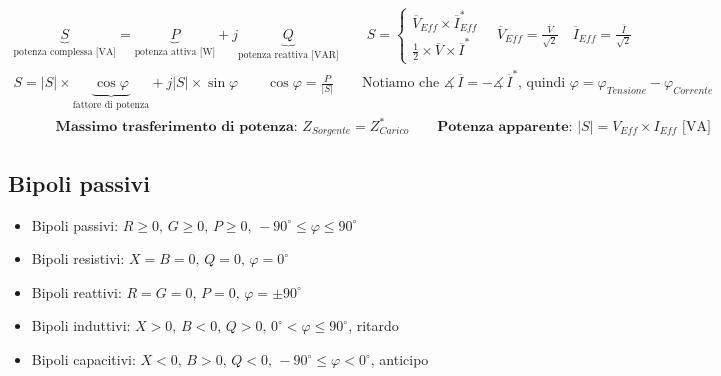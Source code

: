 \documentclass[10pt]{article}
\renewcommand{\deg}{^{\circ}}
\begin{document}
        \begin{gather*}
            \underbrace{S}_{\text{potenza complessa [VA]}} = \underbrace{P}_{\text{potenza attiva [W]}} + j \underbrace{Q}_{\text{potenza reattiva [VAR]}} \qquad
                S =
                    \begin{cases}
                        \overline{V}_{Eff} \times \overline{I}^*_{Eff}\\
                        \frac{1}{2} \times \overline{V} \times \overline{I}^*
                    \end{cases}
                \quad \overline{V}_{Eff} = \frac{\overline{V}}{\sqrt{2}} \quad \overline{I}_{Eff} = \frac{\overline{I}}{\sqrt{2}}\\
                S = |S| \times \underbrace{\cos \varphi}_{\text{fattore di potenza}} + j |S| \times \sin \varphi \qquad \cos \varphi = \frac{P}{|S|} \qquad \text{Notiamo che } \measuredangle \, \overline{I} = - \measuredangle \, \overline{I}^* \text{, quindi } \varphi = \varphi_{Tensione} - \varphi_{Corrente}\\
                \qquad\quad\textbf{Massimo trasferimento di potenza: } Z_{Sorgente} = Z^*_{Carico} \qquad \textbf{Potenza apparente: } |S| = V_{Eff} \times I_{Eff} \text{ [VA]}
            \end{gather*}

    \vspace{-2\baselineskip}
    \subsection*{Bipoli passivi}
    \vspace{-.5\baselineskip}

        \begin{minipage}[t]{.45\textwidth}
            \begin{itemize}
                \item Bipoli passivi: \(R \geqslant 0,\, G \geqslant 0,\, P \geqslant 0,\, -90\deg \leqslant \varphi \leqslant 90\deg\)
                \item Bipoli resistivi: \(X=B=0,\, Q=0,\, \varphi=0\deg\)
                \item Bipoli reattivi: \(R=G=0,\, P=0,\, \varphi=\pm90\deg\)
            \end{itemize}
        \end{minipage}
        \hfill
        \begin{minipage}[t]{.55\textwidth}
            \begin{itemize}
                \item Bipoli induttivi: \(X > 0,\, B<0,\, Q>0,\, 0\deg < \varphi \leqslant 90\deg\), ritardo
                \item Bipoli capacitivi: \(X<0,\, B>0,\, Q<0,\, -90\deg \leqslant \varphi < 0\deg\), anticipo
            \end{itemize}
        \end{minipage}
\end{document}
